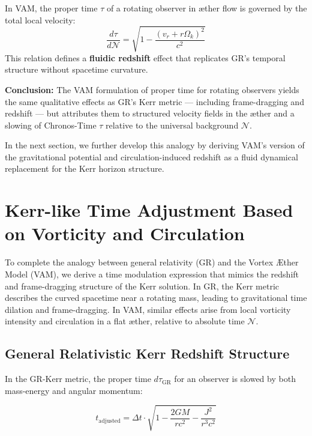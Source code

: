 \documentclass[preprint]{revtex4-2}
\begin{document}
\begin{tcolorbox}[colback=gray!5, colframe=black!70, sharp corners=southwest, title=Chronos-Time in a Rotating Æther]
In VAM, the proper time \( \tau \) of a rotating observer in æther flow is governed by the total local velocity:
\[
\frac{d\tau}{d\mathcal{N}} = \sqrt{1 - \frac{(v_r + r\Omega_k)^2}{c^2}}
\]
This relation defines a \textbf{fluidic redshift} effect that replicates GR's temporal structure without spacetime curvature.
\end{tcolorbox}

\textbf{Conclusion:} The VAM formulation of proper time for rotating observers yields the same qualitative effects as GR’s Kerr metric — including frame-dragging and redshift — but attributes them to structured velocity fields in the æther and a slowing of Chronos-Time \( \tau \) relative to the universal background \( \mathcal{N} \).

In the next section, we further develop this analogy by deriving VAM’s version of the gravitational potential and circulation-induced redshift as a fluid dynamical replacement for the Kerr horizon structure.

\section{Kerr-like Time Adjustment Based on Vorticity and Circulation}

To complete the analogy between general relativity (GR) and the Vortex Æther Model (VAM), we derive a time modulation expression that mimics the redshift and frame-dragging structure of the Kerr solution. In GR, the Kerr metric describes the curved spacetime near a rotating mass, leading to gravitational time dilation and frame-dragging. In VAM, similar effects arise from local vorticity intensity and circulation in a flat æther, relative to absolute time \( \mathcal{N} \).

\subsection{General Relativistic Kerr Redshift Structure}

In the GR-Kerr metric, the proper time \( d\tau_{\text{GR}} \) for an observer is slowed by both mass-energy and angular momentum:

\begin{equation}
    t_{\text{adjusted}} = \Delta t \cdot \sqrt{1 - \frac{2GM}{rc^2} - \frac{J^2}{r^3c^2}}
    \label{eq:Kerr_time_dilation}
\end{equation}
\end{document}
